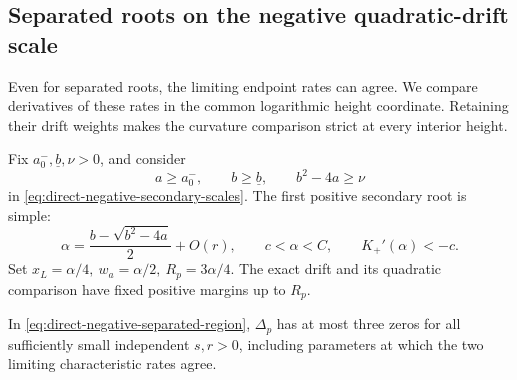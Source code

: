 \subsection{Separated roots on the negative quadratic-drift scale}
\label{sec:direct-negative-separated}

Even for separated roots, the limiting endpoint rates can agree.
We compare derivatives of these rates in the common logarithmic height
coordinate. Retaining their drift weights makes the curvature
comparison strict at every interior height.

Fix \(a_0^-,\underline b,\nu>0\), and consider
\begin{equation}
\label{eq:direct-negative-separated-region}
 a\ge a_0^-,\qquad b\ge \underline b,\qquad b^2-4a\ge\nu
\end{equation}
in \eqref{eq:direct-negative-secondary-scales}.
The first positive secondary root is simple:
\[
 \alpha=\frac{b-\sqrt{b^2-4a}}2+O(r),\qquad
 c<\alpha<C,\qquad K_+'(\alpha)<-c.
\]
Set \(x_L=\alpha/4,\ w_a=\alpha/2,\ R_p=3\alpha/4\).
The exact drift and its quadratic comparison have fixed
positive margins up to \(R_p\).

\begin{proposition}
\label{prop:direct-negative-separated}
In \eqref{eq:direct-negative-separated-region}, \(\Delta_p\)
has at most three zeros for all sufficiently
small independent \(s,r>0\), including parameters at
which the two limiting characteristic rates agree.
\end{proposition}

